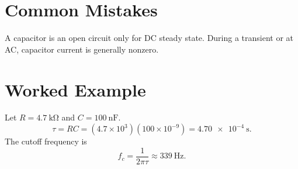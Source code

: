 \section{Common Mistakes}
\begin{mistakebox}
A capacitor is an open circuit only for DC steady state. During a transient or
at AC, capacitor current is generally nonzero.
\end{mistakebox}

\section{Worked Example}
Let \(R=\SI{4.7}{\kilo\ohm}\) and \(C=\SI{100}{\nano\farad}\).
\[
\tau=RC=(4.7\times10^3)(100\times10^{-9})
=\SI{4.70e-4}{\second}.
\]
The cutoff frequency is
\[
f_c=\frac{1}{2\pi\tau}\approx \SI{339}{\hertz}.
\]
